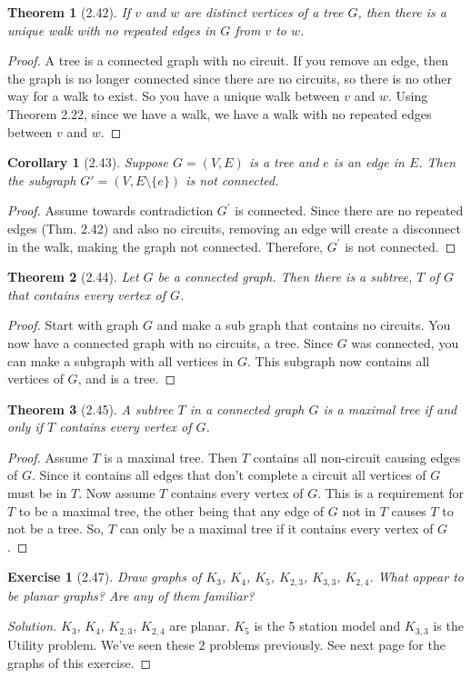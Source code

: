 \documentclass{article}
\newtheorem*{thm}{Theorem}
\newtheorem*{ex}{Exercise}
\newtheorem*{cor}{Corollary}
\newenvironment{solution}
  {\begin{proof}[Solution]}
  {\renewcommand{\qedsymbol}{}\end{proof}}
\begin{document}
\begin{thm}[2.42]
	If $v$ and $w$ are distinct vertices of a tree $G$, then there is a unique walk with no repeated edges in $G$ from $v$ to $w$.
\end{thm}
\begin{proof}
	A tree is a connected graph with no circuit. If you remove an edge, then the graph is no longer connected since there are no
	circuits, so there is no other way for a walk to exist. So you have a unique walk between $v$ and $w$. Using Theorem 2.22,
	since we have a walk, we have a walk with no repeated edges between $v$ and $w$.
	
\end{proof}

\begin{cor}[2.43]
	Suppose $G = (V,E)$ is a tree and $e$ is an edge in $E$. Then the subgraph $G\prime = (V,E \setminus \{e\})$ is not connected.   
\end{cor}
\begin{proof}
	Assume towards contradiction $G^\prime$ is connected. Since there are no repeated edges (Thm. 2.42) and also no circuits, 
	removing an edge will create a disconnect in the walk, making the graph not connected. Therefore, $G^\prime$ is not connected. 
\end{proof}

\begin{thm}[2.44]
	Let $G$ be a connected graph. Then there is a subtree, $T$ of $G$ that contains every vertex of $G$.
\end{thm}
\begin{proof}
	Start with graph $G$ and make a sub graph that contains no circuits. You now have a connected graph with no circuits, a tree. Since
	$G$ was connected, you can make a subgraph with all vertices in $G$. This subgraph now contains all vertices of $G$, and is a tree.
\end{proof}

\begin{thm}[2.45]
	A subtree $T$ in a connected graph $G$ is a maximal tree if and only if $T$ contains every vertex of $G$. 
\end{thm}
\begin{proof}
	Assume $T$ is a maximal tree. Then $T$ contains all non-circuit causing edges of $G$. Since it contains all edges that don't complete a circuit
	all vertices of $G$ must be in $T$. Now assume $T$ contains every vertex of $G$. This is a requirement for $T$ to be a maximal tree, the other
	being that any edge of $G$ not in $T$ causes $T$ to not be a tree. So, $T$ can only be a maximal tree if it contains every vertex of $G$. 
\end{proof}

\begin{ex}[2.47]
	Draw graphs of $K_3$, $K_4$, $K_5$, $K_{2,3}$, $K_{3,3}$, $K_{2,4}$. What appear to be planar graphs? Are any of them familiar?
\end{ex}
\begin{solution}
	 $K_3$, $K_4$, $K_{2,3}$, $K_{2,4}$ are planar. $K_5$ is the 5 station model and $K_{3,3}$ is the Utility problem. We've seen these 2 problems
	 previously. See next page for the graphs of this exercise. 
\end{solution}
\end{document}
